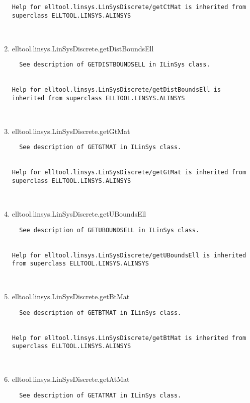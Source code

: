 \begin{enumerate}
\begin{lstlisting}
Help for elltool.linsys.LinSysDiscrete/getCtMat is inherited from superclass ELLTOOL.LINSYS.ALINSYS



\end{lstlisting}
\fontfamily{\familydefault}
\selectfont
\item {elltool.linsys.LinSysDiscrete.getDistBoundsEll}
\selectfont
\begin{lstlisting}
  See description of GETDISTBOUNDSELL in ILinSys class.


Help for elltool.linsys.LinSysDiscrete/getDistBoundsEll is inherited from superclass ELLTOOL.LINSYS.ALINSYS



\end{lstlisting}
\fontfamily{\familydefault}
\selectfont
\item {elltool.linsys.LinSysDiscrete.getGtMat}
\selectfont
\begin{lstlisting}
  See description of GETGTMAT in ILinSys class.


Help for elltool.linsys.LinSysDiscrete/getGtMat is inherited from superclass ELLTOOL.LINSYS.ALINSYS



\end{lstlisting}
\fontfamily{\familydefault}
\selectfont
\item {elltool.linsys.LinSysDiscrete.getUBoundsEll}
\selectfont
\begin{lstlisting}
  See description of GETUBOUNDSELL in ILinSys class.


Help for elltool.linsys.LinSysDiscrete/getUBoundsEll is inherited from superclass ELLTOOL.LINSYS.ALINSYS



\end{lstlisting}
\fontfamily{\familydefault}
\selectfont
\item {elltool.linsys.LinSysDiscrete.getBtMat}
\selectfont
\begin{lstlisting}
  See description of GETBTMAT in ILinSys class.


Help for elltool.linsys.LinSysDiscrete/getBtMat is inherited from superclass ELLTOOL.LINSYS.ALINSYS



\end{lstlisting}
\fontfamily{\familydefault}
\selectfont
\item {elltool.linsys.LinSysDiscrete.getAtMat}
\selectfont
\begin{lstlisting}
  See description of GETATMAT in ILinSys class.



\end{lstlisting}
\end{enumerate}
